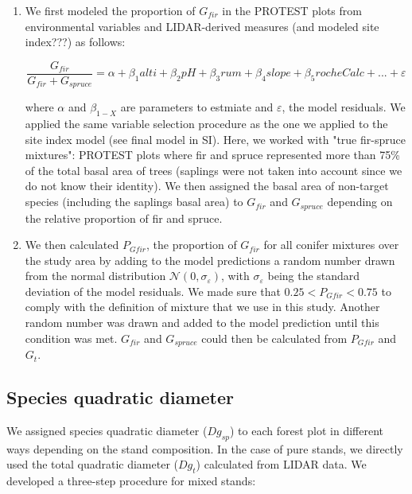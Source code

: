 \documentclass[a4paper]{article}
\begin{document}
\begin{enumerate}

  \item We first modeled the proportion of $G_{fir}$ in the PROTEST plots from environmental variables and LIDAR-derived measures (and modeled site index???) as follows:

  \begin{equation}\label{gfir-spruce}
    \frac{G_{fir}}{G_{fir} + G_{spruce}} = \alpha + \beta_1 alti + \beta_2 pH +\beta_3 rum +\beta_4 slope +\beta_5 rocheCalc+...+ \varepsilon
  \end{equation}

  \noindent where $\alpha$ and $\beta_{1-X}$ are parameters to estmiate and $\varepsilon$, the model residuals. We applied the same variable selection procedure as the one we applied to the site index model (see final model in SI). Here, we worked with "true fir-spruce mixtures": PROTEST plots where fir and spruce represented more than 75\% of the total basal area of trees (saplings were not taken into account since we do not know their identity). We then assigned the basal area of non-target species (including the saplings basal area) to $G_{fir}$ and $G_{spruce}$ depending on the relative proportion of fir and spruce.

  \item We then calculated $P_{Gfir}$, the proportion of $G_{fir}$ for all conifer mixtures over the study area by adding to the model predictions a random number drawn from the normal distribution $\mathcal{N} (0, \sigma_\varepsilon)$, with $\sigma_\varepsilon$ being the standard deviation of the model residuals. We made sure that $0.25 < P_{Gfir} < 0.75$ to comply with the definition of mixture that we use in this study. Another random number was drawn and added to the model prediction until this condition was met. $G_{fir}$ and $G_{spruce}$ could then be calculated from $P_{Gfir}$ and $G_t$.

\end{enumerate}


\subsection*{Species quadratic diameter}\label{Dg}

We assigned species quadratic diameter ($Dg_{sp}$) to each forest plot in different ways depending on the stand composition. In the case of pure stands, we directly used the total quadratic diameter ($Dg_t$) calculated from LIDAR data. We developed a three-step procedure for mixed stands:
\end{document}
